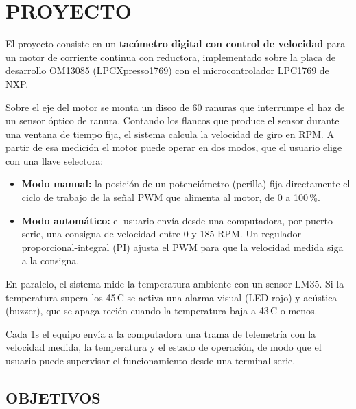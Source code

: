 \section{PROYECTO}

El proyecto consiste en un \textbf{tacómetro digital con control de velocidad} para un
motor de corriente continua con reductora, implementado sobre la placa de desarrollo
OM13085 (LPCXpresso1769) con el microcontrolador LPC1769 de NXP.

Sobre el eje del motor se monta un disco de 60 ranuras que interrumpe el haz de un
sensor óptico de ranura. Contando los flancos que produce el sensor durante una ventana
de tiempo fija, el sistema calcula la velocidad de giro en RPM. A partir de esa medición
el motor puede operar en dos modos, que el usuario elige con una llave selectora:

\begin{itemize}
  \item \textbf{Modo manual:} la posición de un potenciómetro (perilla) fija directamente
  el ciclo de trabajo de la señal PWM que alimenta al motor, de 0 a 100\,\%.
  \item \textbf{Modo automático:} el usuario envía desde una computadora, por puerto serie,
  una consigna de velocidad entre 0 y 185 RPM. Un regulador proporcional-integral (PI)
  ajusta el PWM para que la velocidad medida siga a la consigna.
\end{itemize}

En paralelo, el sistema mide la temperatura ambiente con un sensor LM35. Si la
temperatura supera los 45\,\textdegree C se activa una alarma visual (LED rojo) y acústica
(buzzer), que se apaga recién cuando la temperatura baja a 43\,\textdegree C o menos.

Cada 1s el equipo envía a la computadora una trama de telemetría con la velocidad
medida, la temperatura y el estado de operación, de modo que el usuario puede supervisar
el funcionamiento desde una terminal serie.

\subsection{OBJETIVOS}

